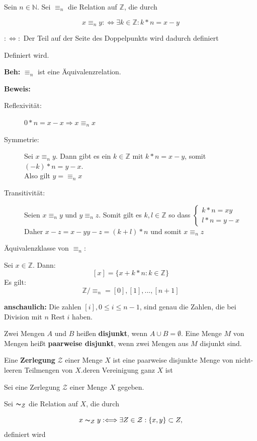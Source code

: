 \documentclass{scrartcl}
\begin{document}
Sein $n \in \mathbb{N}$. Sei $\equiv_n$ die Relation auf $\mathbb{Z}$, die durch 

\[x \equiv_n y :\Longleftrightarrow \exists k \in \mathbb{Z}: k*n=x-y\]

$: \Longleftrightarrow:$ Der Teil auf der Seite des Doppelpunkts wird dadurch definiert

Definiert wird.

\textbf{Beh:} $\equiv_n$ ist eine Äquivalenzrelation.

\textbf{Beweis:}

\begin{description}
  \item[Reflexivität:] $0*n=x-x \Longrightarrow x \equiv_n x$
  \item[Symmetrie:] Sei $x \equiv_n y$. Dann gibt es ein $k \in \mathbb{Z}$ mit $k*n=x-y$, somit $(-k)*n=y-x$. \\
  Also gilt $y=\equiv_n x$
  \item[Transitivität:] Seien $x\equiv_n y$ und $y \equiv_n z$. Somit gilt es $k,l \in \mathbb{Z}$ so dass $\left\{ 
    \begin{array}{l}
        k*n=xy \\
        l*n=y-x 
    \end{array}\right.$ 
    Daher $x-z=x-y
    y-z=(k+l)*n$ und somit $x \equiv_n z$
\end{description}

Äquivalenzklasse von $\equiv_n$:

Sei $x \in \mathbb{Z}$. Dann:
\[[x]=\{x+k*n:k\in \mathbb{Z}\}\]
Es gilt:
\[\mathbb{Z}/\equiv_n = {[0],[1],...,[n+1]}\]

\textbf{anschaulich:} Die zahlen $[i], 0\leq i \leq n-1$, sind genau die Zahlen, die bei Division mit $n$ Rest $i$ haben. 

Zwei Mengen $A$ und $B$ heißen \textbf{disjunkt}, wenn $A \cup B = \emptyset$. Eine Menge $M$ von Mengen heißt \textbf{paarweise disjunkt}, wenn zwei Mengen aus $M$ disjunkt sind.

Eine \textbf{Zerlegung} $\mathcal{Z}$ einer Menge $X$ ist eine paarweise disjunkte Menge von nicht-leeren Teilmengen von $X$.deren Vereinigung ganz $X$ ist  

Sei eine Zerlegung $\mathcal{Z}$ einer Menge $X$ gegeben.

Sei $\thicksim_{\mathcal{Z}}$ die Relation auf $X$, die durch

\[x \thicksim_{\mathcal{Z}} y : \Longleftrightarrow \exists Z \in \mathcal{Z}:\{x,y\}\subset Z,\]
definiert wird
\end{document}
